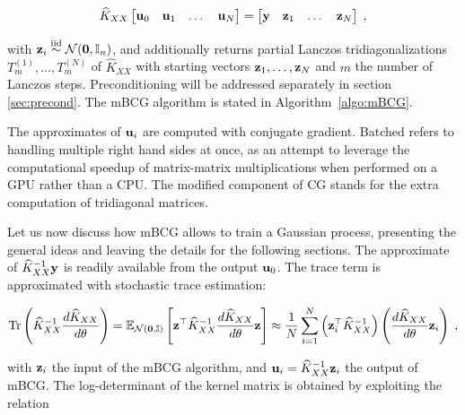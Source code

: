 \documentclass{article}
\begin{document}
{\begin{equation} \label{eq:mbcg_equation}
    \widehat K_{XX} \begin{bmatrix} \boldsymbol{\mathbf{u}}_0 & \boldsymbol{\mathbf{u}}_1 & \dots & \boldsymbol{\mathbf{u}}_N \end{bmatrix} = 
    \begin{bmatrix} \boldsymbol{\mathbf{y}} & \boldsymbol{\mathbf{z}}_1 & \dots & \boldsymbol{\mathbf{z}}_N \end{bmatrix} \; ,
\end{equation}

with $\vect z_i \stackrel{\text{iid}}{\sim} \mathcal N(\vect 0, \Id[n])$, and additionally returns partial Lanczos tridiagonalizations $T_m^{(1)}, \ldots, T_m^{(N)}$ of $\widehat K_{XX}$ with starting vectors $\boldsymbol{\mathbf{z}}_1, \ldots, \boldsymbol{\mathbf{z}}_N$ and $m$ the number of Lanczos steps. Preconditioning will be addressed separately in section \ref{sec:precond}. The mBCG algorithm is stated in Algorithm~\ref{algo:mBCG}.%

The approximates of $\boldsymbol{\mathbf{u}}_i$ are computed with conjugate gradient. Batched refers to handling multiple right hand sides at once, as an attempt to leverage the computational speedup of matrix-matrix multiplications when performed on a GPU rather than a CPU. The modified component of CG stands for the extra computation of tridiagonal matrices.

Let us now discuss how mBCG allows to train a Gaussian process, presenting the general ideas and leaving the details for the following sections. The approximate of $\widehat K_{XX}^{-1} \boldsymbol{\mathbf{y}}$ is readily available from the output $\boldsymbol{\mathbf{u}}_0$. The trace term is approximated with stochastic trace estimation:

\begin{equation} \label{eq:trace_term}
    \trace \left(\widehat K_{XX}^{-1} \frac{d \widehat K_{XX}}{d\theta} \right) 
    = \E_{\mathcal N(\vect 0, \Id)} \left[ \vect z^\top \widehat K_{XX}^{-1}  \frac{d \widehat K_{XX}}{d\theta} \vect z \right]
    \approx \frac{1}{N} \sum_{i=1}^N \left( \vect z_i^\top \widehat K_{XX}^{-1} \right) \left( \frac{d \widehat K_{XX}}{d\theta} \vect z_i \right)\; ,
\end{equation}

with $\boldsymbol{\mathbf{z}}_i$ the input of the mBCG algorithm, and $\boldsymbol{\mathbf{u}}_i = \widehat K_{XX}^{-1} \boldsymbol{\mathbf{z}}_i$ the output of mBCG. The log-determinant of the kernel matrix is obtained by exploiting the relation

}
\end{document}
